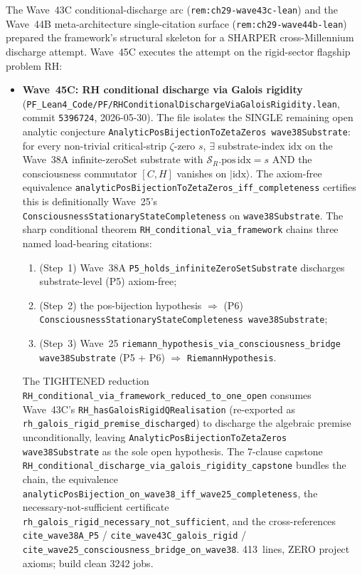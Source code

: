 \begin{remark}\label{rem:ch29-wave45c-lean}
The Wave~43C conditional-discharge arc (\texttt{rem:ch29-wave43c-lean}) and the Wave~44B meta-architecture single-citation surface (\texttt{rem:ch29-wave44b-lean}) prepared the framework's structural skeleton for a SHARPER cross-Millennium discharge attempt. Wave~45C executes the attempt on the rigid-sector flagship problem RH:
\begin{itemize}
  \item \textbf{Wave~45C: RH conditional discharge via Galois rigidity} (\texttt{PF\_Lean4\_Code/PF/RHConditionalDischargeViaGaloisRigidity.lean}, commit \texttt{5396724}, 2026-05-30). The file isolates the SINGLE remaining open analytic conjecture \texttt{AnalyticPosBijectionToZetaZeros wave38Substrate}: for every non-trivial critical-strip $\zeta$-zero $s$, $\exists$ substrate-index $\mathrm{idx}$ on the Wave~38A infinite-zeroSet substrate with $\mathcal{S}_R.\mathrm{pos}\,\mathrm{idx} = s$ AND the consciousness commutator $[C, H]$ vanishes on $|\mathrm{idx}\rangle$. The axiom-free equivalence \texttt{analyticPosBijectionToZetaZeros\_iff\_completeness} certifies this is definitionally Wave~25's \texttt{ConsciousnessStationaryStateCompleteness} on \texttt{wave38Substrate}. The sharp conditional theorem \texttt{RH\_conditional\_via\_framework} chains three named load-bearing citations:
  \begin{enumerate}
    \item (Step~1) Wave~38A \texttt{P5\_holds\_infiniteZeroSetSubstrate} discharges substrate-level (P5) axiom-free;
    \item (Step~2) the pos-bijection hypothesis $\Rightarrow$ (P6) \texttt{ConsciousnessStationaryStateCompleteness wave38Substrate};
    \item (Step~3) Wave~25 \texttt{riemann\_hypothesis\_via\_consciousness\_bridge wave38Substrate} (P5 + P6) $\Rightarrow$ \texttt{RiemannHypothesis}.
  \end{enumerate}
  The TIGHTENED reduction \texttt{RH\_conditional\_via\_framework\_reduced\_to\_one\_open} consumes Wave~43C's \texttt{RH\_hasGaloisRigidQRealisation} (re-exported as \texttt{rh\_galois\_rigid\_premise\_discharged}) to discharge the algebraic premise unconditionally, leaving \texttt{AnalyticPosBijectionToZetaZeros wave38Substrate} as the sole open hypothesis. The 7-clause capstone \texttt{RH\_conditional\_discharge\_via\_galois\_rigidity\_capstone} bundles the chain, the equivalence \texttt{analyticPosBijection\_on\_wave38\_iff\_wave25\_completeness}, the necessary-not-sufficient certificate \texttt{rh\_galois\_rigid\_necessary\_not\_sufficient}, and the cross-references \texttt{cite\_wave38A\_P5} / \texttt{cite\_wave43C\_galois\_rigid} / \texttt{cite\_wave25\_consciousness\_bridge\_on\_wave38}. 413~lines, ZERO project axioms; build clean 3242 jobs.

\end{itemize}
\end{remark}

